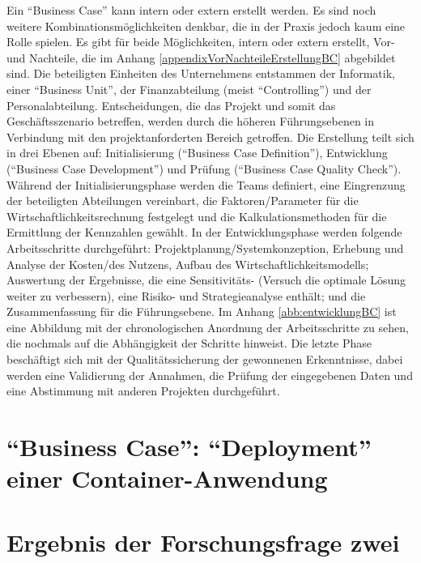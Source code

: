 Ein \enquote{Business Case} kann intern oder extern erstellt werden. Es sind noch weitere Kombinationsmöglichkeiten denkbar, die in der Praxis jedoch kaum eine Rolle spielen.\autocite[vgl.][S.\,33]{brugger_it_2009} Es gibt für beide Möglichkeiten, intern oder extern erstellt, Vor- und Nachteile, die im Anhang \vref{appendixVorNachteileErstellungBC} abgebildet sind. Die beteiligten Einheiten des Unternehmens entstammen der Informatik, einer \enquote{Business Unit}, der Finanzabteilung (meist \enquote{Controlling}) und der Personalabteilung. Entscheidungen, die das Projekt und somit das Geschäftsszenario betreffen, werden durch die höheren Führungsebenen in Verbindung mit den projektanforderten Bereich getroffen. Die Erstellung teilt sich in drei Ebenen auf: Initialisierung (\enquote{Business Case Definition}), Entwicklung (\enquote{Business Case Development}) und Prüfung (\enquote{Business Case Quality Check}).\autocite[vgl.][S.\,41-42]{brugger_it_2009} Während der Initialisierungsphase werden die Teams definiert, eine Eingrenzung der beteiligten Abteilungen vereinbart, die Faktoren/Parameter für die Wirtschaftlichkeitsrechnung festgelegt und die Kalkulationsmethoden für die Ermittlung der Kennzahlen gewählt. In der Entwicklungsphase werden folgende Arbeitsschritte durchgeführt: Projektplanung/Systemkonzeption, Erhebung und Analyse der Kosten/des Nutzens, Aufbau des Wirtschaftlichkeitsmodells; Auswertung der Ergebnisse, die eine Sensitivitäts- (Versuch die optimale Lösung weiter zu verbessern), eine Risiko- und Strategieanalyse enthält; und die Zusammenfassung für die Führungsebene. Im Anhang \vref{abb:entwicklungBC} ist eine Abbildung mit der chronologischen Anordnung der Arbeitsschritte zu sehen, die nochmals auf die Abhängigkeit der Schritte hinweist. Die letzte Phase beschäftigt sich mit der Qualitätssicherung der gewonnenen Erkenntnisse, dabei werden eine Validierung der Annahmen, die Prüfung der eingegebenen Daten und eine Abstimmung mit anderen Projekten durchgeführt. 

\section{\enquote{Business Case}: \enquote{Deployment} einer Container-Anwendung}
%
%

\section{Ergebnis der Forschungsfrage zwei}
